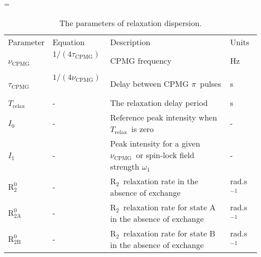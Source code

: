 \documentclass[a4paper,11pt,twoside,openright]{book}
\makeatletter
\let\realnormalsize=\normalsize
\def\liih@math{\ifmmode$\else\bad@math\fi}
\def\adjustnormalsize{\def\normalsize{\mathsurround=0pt \realnormalsize
 \parindent=0pt\abovedisplayskip=0pt\belowdisplayskip=0pt}%
 \def\phantompar{\csname par\endcsname}\normalsize}%
\newcommand\lthtmlvboxmathA{\adjustnormalsize\setbox\sizebox=\vbox\bgroup %
 \let\ifinner=\iffalse \let\)\liih@math }%
\newcommand\lthtmlmathtype[1]{\gdef\lthtmlmathenv{#1}}%
\newcommand\lthtmlfigureA[1]{\let\@savefreelist\@freelist
       \lthtmlmathtype{#1}\lthtmlvboxmathA}%
\makeatother
\begin{document}
{\newpage\clearpage
\lthtmlfigureA{landscape10622}%
\begin{landscape}

\begin{center}
\begin{small}
\par
\begin{longtable}{llll}
\par
\caption[The parameters of relaxation dispersion.]{The parameters of relaxation dispersion.}
\par
\\
\toprule
Parameter          & Equation                       & Description                                                                   & Units \\
\midrule
\endhead
\par
\bottomrule
\endfoot
\par
\par
$\nu_{\textrm{CPMG}}$\           & $1 / (4 \tau_{\textrm{CPMG}})$\              & CPMG frequency                                                                & Hz \\
$\tau_{\textrm{CPMG}}$\          & $1 / (4 \nu_{\textrm{CPMG}})$\               & Delay between CPMG $\pi$\  pulses                                               & s \\
$T_\textrm{relax}$\  & -                              & The relaxation delay period                                                   & s \\
$I_0$\               & -                              & Reference peak intensity when $T_\textrm{relax}$\  is zero                      & - \\
$I_1$\               & -                              & Peak intensity for a given $\nu_{\textrm{CPMG}}$\  or spin-lock field strength $\omega_1$\    & - \\
$\mathrm{R}_2^0$\         & -                              & $\mathrm{R}_2$\  relaxation rate in the absence of exchange                            & rad.s$^{-1}$\  \\
$\mathrm{R}_{\mathrm{2A}}^0$\        & -                              & $\mathrm{R}_2$\  relaxation rate for state A in the absence of exchange                & rad.s$^{-1}$\  \\
$\mathrm{R}_{\mathrm{2B}}^0$\        & -                              & $\mathrm{R}_2$\  relaxation rate for state B in the absence of exchange                & rad.s$^{-1}$\  \\

\end{longtable}
\end{small}
\end{center}
\end{landscape}}
\end{document}
